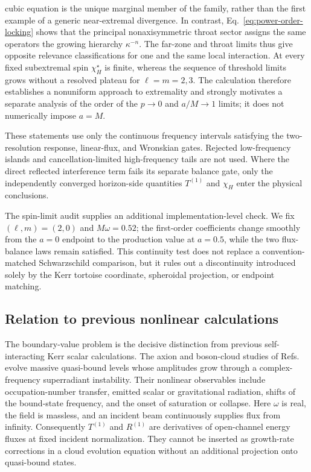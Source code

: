 \documentclass[aps,prd,twocolumn,10pt,nofootinbib,superscriptaddress,floatfix]{revtex4-2}
\begin{document}
cubic equation is the unique marginal member of the family, rather than the
first example of a generic near-extremal divergence.  In contrast,
Eq.~\eqref{eq:power-order-locking} shows that the principal nonaxisymmetric
throat sector assigns the same operators the growing hierarchy
$\kappa^{-n}$.  The far-zone and throat limits thus give opposite relevance
classifications for one and the same local interaction.
At every fixed subextremal spin $\chi_H^\star$ is finite, whereas the sequence
of threshold limits grows without a resolved plateau for $\ell=m=2,3$.  The
calculation therefore establishes a nonuniform approach to extremality and
strongly motivates a separate analysis of the order of the $p\to0$ and
$a/M\to1$ limits; it does not numerically impose $a=M$.

These statements use only the continuous frequency intervals satisfying the
two-resolution response, linear-flux, and Wronskian gates.  Rejected
low-frequency islands and cancellation-limited high-frequency tails are not
used.  Where the direct reflected interference term fails its separate
balance gate, only the independently converged horizon-side quantities
$T^{(1)}$ and $\chi_H$ enter the physical conclusions.

The spin-limit audit supplies an additional implementation-level check.  We
fix $(\ell,m)=(2,0)$ and $M\omega=0.52$; the first-order coefficients change
smoothly from the $a=0$ endpoint to the production value at $a=0.5$, while the
two flux-balance laws remain satisfied.  This continuity test does not replace a
convention-matched Schwarzschild comparison, but it rules out a discontinuity
introduced solely by the Kerr tortoise coordinate, spheroidal projection, or
endpoint matching.

\subsection{Relation to previous nonlinear calculations}

The boundary-value problem is the decisive distinction from previous
self-interacting Kerr scalar calculations.  The axion and boson-cloud studies
of Refs.~\cite{YoshinoKodama2012,FukudaNakayama2020,Omiya2021,
Baryakhtar2021,XieHuang2025} evolve massive quasi-bound levels whose amplitudes
grow through a complex-frequency superradiant instability.  Their nonlinear
observables include occupation-number transfer, emitted scalar or gravitational
radiation, shifts of the bound-state frequency, and the onset of saturation or
collapse.  Here $\omega$ is real, the field is massless, and an incident beam
continuously supplies flux from infinity.  Consequently $T^{(1)}$ and
$R^{(1)}$ are derivatives of open-channel energy fluxes at fixed incident
normalization.  They cannot be inserted as growth-rate corrections in a cloud
evolution equation without an additional projection onto quasi-bound states.
\end{document}
